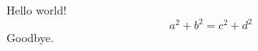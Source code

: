 \documentclass{article}
\begin{document}
    \centering
    Hello world!
    \[ a^2 + b^2 = c^2 + d^2 \]
    Goodbye.
\end{document}
